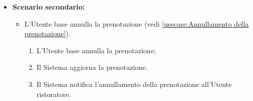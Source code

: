 \begin{itemize}
	\item \textbf{Scenario secondario:}
	      \begin{itemize}
		      \item L'Utente base annulla la prenotazione (vedi
		            \autoref{usecase:Annullamento della prenotazione}).
		            \begin{enumerate}
			            \item L'Utente base annulla la prenotazione;
			            \item Il Sistema aggiorna la prenotazione.
			            \item Il Sistema notifica l'annullamento della prenotazione
			                  all'Utente ristoratore.
		            \end{enumerate}
	      \end{itemize}
\end{itemize}

